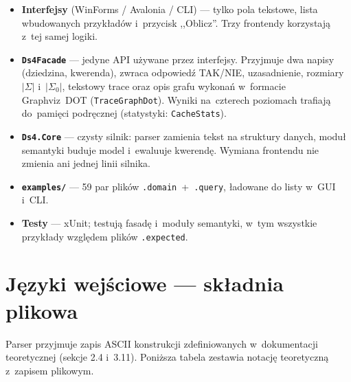 \documentclass[11pt,a4paper]{article}
\begin{document}
\begin{itemize}
  \item \textbf{Interfejsy} (WinForms / Avalonia / CLI) --- tylko pola tekstowe,
        lista wbudowanych przykładów i~przycisk ,,Oblicz''. Trzy frontendy
        korzystają z~tej samej logiki.
  \item \texttt{\textbf{Ds4Facade}} --- jedyne API używane przez interfejsy.
        Przyjmuje dwa napisy (dziedzina, kwerenda), zwraca odpowiedź TAK/NIE,
        uzasadnienie, rozmiary $|\Sigma|$ i~$|\Sigma_0|$, tekstowy trace oraz
        opis grafu wykonań w~formacie Graphviz~DOT (\texttt{TraceGraphDot}).
        Wyniki na~czterech poziomach trafiają do~pamięci podręcznej
        (statystyki: \texttt{CacheStats}).
  \item \texttt{\textbf{Ds4.Core}} --- czysty silnik: parser zamienia tekst na
        struktury danych, moduł semantyki buduje model i~ewaluuje kwerendę.
        Wymiana frontendu nie zmienia ani jednej linii silnika.
  \item \texttt{\textbf{examples/}} --- 59 par plików
        \texttt{.domain}~+~\texttt{.query}, ładowane do listy w~GUI i~CLI.
  \item \textbf{Testy} --- xUnit; testują fasadę i~moduły semantyki, w~tym
        wszystkie przykłady względem plików \texttt{.expected}.
\end{itemize}

\section{Języki wejściowe --- składnia plikowa}

Parser przyjmuje zapis ASCII konstrukcji zdefiniowanych w~dokumentacji
teoretycznej (sekcje 2.4 i~3.11). Poniższa tabela zestawia notację
teoretyczną z~zapisem plikowym.
\end{document}
